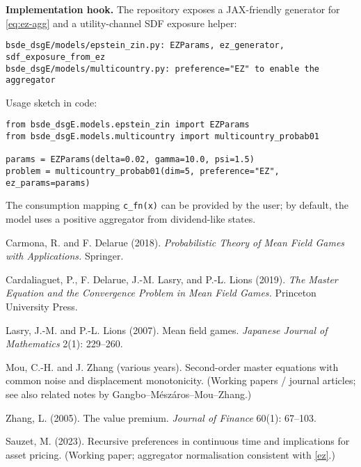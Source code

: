 \documentclass[11pt,letterpaper,oneside]{article}
\numberwithin{equation}{section}
\newcommand{\1}{\mathbf{1}}
\begin{document}
\begin{tcolorbox}[didacticstyle]
\textbf{Implementation hook.} The repository exposes a JAX-friendly generator
for \eqref{eq:ez-agg} and a utility-channel SDF exposure helper:
\begin{verbatim}
bsde_dsgE/models/epstein_zin.py: EZParams, ez_generator, sdf_exposure_from_ez
bsde_dsgE/models/multicountry.py: preference="EZ" to enable the aggregator
\end{verbatim}
Usage sketch in code:
\begin{verbatim}
from bsde_dsgE.models.epstein_zin import EZParams
from bsde_dsgE.models.multicountry import multicountry_probab01

params = EZParams(delta=0.02, gamma=10.0, psi=1.5)
problem = multicountry_probab01(dim=5, preference="EZ", ez_params=params)
\end{verbatim}
The consumption mapping \verb|c_fn(x)| can be provided by the user; by default,
the model uses a positive aggregator from dividend-like states.
\end{tcolorbox}

\begin{thebibliography}{99}\small

 Carmona, R. and F. Delarue (2018).
\emph{Probabilistic Theory of Mean Field Games with Applications.}
Springer.

 Cardaliaguet, P., F. Delarue, J.-M. Lasry, and P.-L. Lions (2019).
\emph{The Master Equation and the Convergence Problem in Mean Field Games.}
Princeton University Press.

 Lasry, J.-M. and P.-L. Lions (2007).
Mean field games.
\emph{Japanese Journal of Mathematics} 2(1): 229--260.

 Mou, C.-H. and J. Zhang (various years).
Second-order master equations with common noise and displacement monotonicity.
(Working papers / journal articles; see also related notes by Gangbo--Mészáros--Mou--Zhang.)

 Zhang, L. (2005).
The value premium.
\emph{Journal of Finance} 60(1): 67--103.

 Sauzet, M. (2023).
Recursive preferences in continuous time and implications for asset pricing.
(Working paper; aggregator normalisation consistent with \cref{ez}.)

\end{thebibliography}
\end{document}
